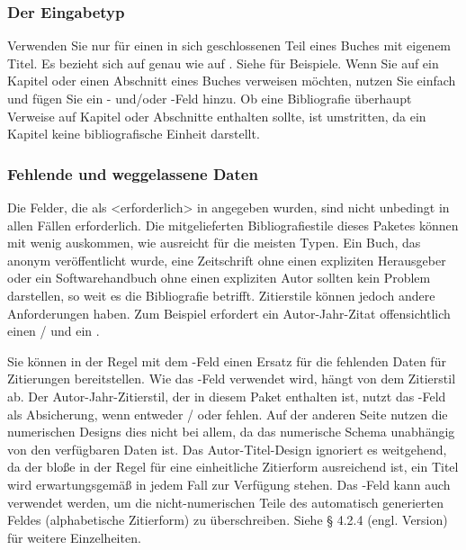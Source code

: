 \documentclass{ltxdockit}[2011/03/25]
\begin{document}
\subsubsection{Der Eingabetyp } \label{bib:use:inb}

Verwenden Sie  nur für einen in sich geschlossenen Teil eines
Buches mit eigenem Titel. Es bezieht sich auf  genau wie
 auf . Siehe  für
Beispiele. Wenn Sie auf ein Kapitel oder einen Abschnitt eines Buches verweisen
möchten, nutzen Sie einfach  und fügen Sie ein
- und\slash oder -Feld hinzu. Ob eine
Bibliografie überhaupt Verweise auf Kapitel oder Abschnitte enthalten sollte,
ist umstritten, da ein Kapitel keine bibliografische Einheit darstellt.


\subsubsection{Fehlende und weggelassene Daten} \label{bib:use:key}

Die Felder, die als <erforderlich> in  angegeben wurden,
sind nicht unbedingt in allen Fällen erforderlich. Die mitgelieferten
Bibliografiestile dieses Paketes können mit wenig auskommen, wie
 ausreicht für die meisten Typen. Ein Buch, das anonym
veröffentlicht wurde, eine Zeitschrift ohne einen expliziten Herausgeber oder
ein Softwarehandbuch ohne einen expliziten Autor sollten  kein Problem
darstellen, so weit es die Bibliografie betrifft. Zitierstile können jedoch
andere Anforderungen haben. Zum Beispiel erfordert ein Autor-Jahr-Zitat
offensichtlich einen \slash {} und ein
.

Sie können in der Regel mit dem -Feld einen Ersatz für die
fehlenden Daten für Zitierungen bereitstellen. Wie das -Feld
verwendet wird, hängt von dem Zitierstil ab. Der Autor-Jahr-Zitierstil, der in
diesem Paket enthalten ist, nutzt das -Feld als Absicherung,
wenn entweder \slash {} oder 
fehlen. Auf der anderen Seite nutzen die numerischen Designs dies nicht bei
allem, da das numerische Schema unabhängig von den verfügbaren Daten ist. Das
Autor-Titel-Design ignoriert es weitgehend, da der bloße  in der
Regel für eine einheitliche Zitierform ausreichend ist, ein Titel wird
erwartungsgemäß in jedem Fall zur Verfügung stehen. Das -Feld
kann auch verwendet werden, um die nicht-numerischen Teile des automatisch
generierten  Feldes (alphabetische Zitierform)  zu
überschreiben.  Siehe § 4.2.4 (engl. Version) %
für weitere Einzelheiten.
\end{document}
